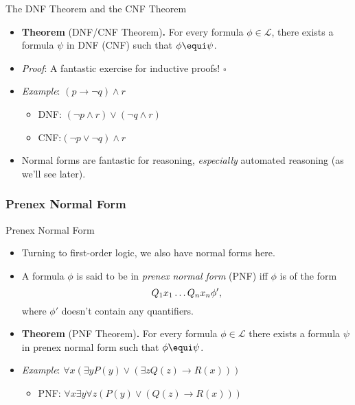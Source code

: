 \begin{frame}{The DNF Theorem and the CNF Theorem}

  \begin{itemize}
  \item \textbf{Theorem} (DNF/CNF Theorem)\textbf{.} For every formula
    $\phi\in\mathcal{L}$, there exists a formula $\psi$ in DNF (CNF)
    such that $\phi\equi \psi$.

   \item \emph{Proof}: A fantastic exercise for inductive proofs! $\square$

  \item \emph{Example}:  $(p\to \neg q)\land r$

    \begin{itemize}

    \item DNF: $(\neg p\land r)\lor (\neg q\land r)$

      \item CNF:$(\neg p\lor \neg q)\land r$

      \end{itemize}

     \item Normal forms are fantastic for reasoning, \emph{especially}
       automated reasoning (as we'll see later). 
    
  \end{itemize}

\end{frame}

\subsubsection{Prenex Normal Form}
\begin{frame}{Prenex Normal Form}

  \begin{itemize}
  \item Turning to first-order logic, we also have normal forms here.

  \item A formula $\phi$ is said to be in \emph{prenex normal form}
    (PNF) 
    iff $\phi$ is of the form \[Q_1x_1\mathellipsis Q_nx_n\phi',\]
    where $\phi'$ doesn't contain any quantifiers.

   \item \textbf{Theorem} (PNF Theorem)\textbf{.} For every formula
   $\phi\in\mathcal{L}$ there exists a formula $\psi$ in prenex normal
   form such that $\phi\equi \psi$.

 \item \emph{Example}: $\forall x(\exists yP(y)\lor (\exists zQ(z)\to
   R(x)))$

   \begin{itemize}
   \item PNF: $\forall x\exists y\forall z(P(y)\lor (Q(z)\to R(x)))$
   \end{itemize}

  \end{itemize}
  
\end{frame}


